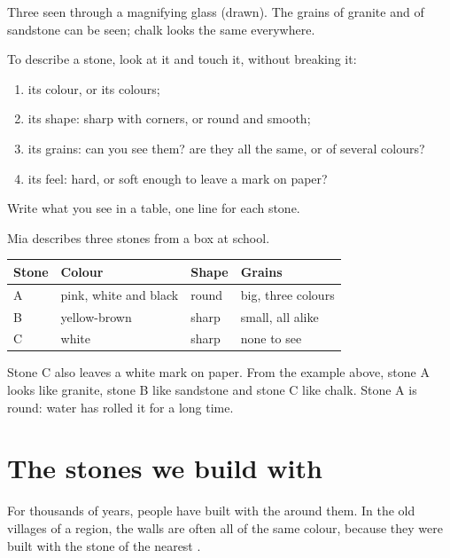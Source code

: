 \begin{omfigure}
{\small Three  seen through a magnifying glass (drawn). The grains of
granite and of sandstone can be seen; chalk looks the same everywhere.}
\label{fig:g3:stones-pebbles-sand:magnified}
\end{omfigure}

\begin{method}\label{met:g3:stones-pebbles-sand:look}
To describe a stone, look at it and touch it, without breaking it:
\begin{enumerate}
  \item its colour, or its colours;
  \item its shape: sharp with corners, or round and smooth;
  \item its grains: can you see them? are they all the same, or of several
        colours?
  \item its feel: hard, or soft enough to leave a mark on paper?
\end{enumerate}
Write what you see in a table, one line for each stone.
\end{method}

\begin{example}\label{ex:g3:stones-pebbles-sand:table}
Mia describes three stones from a box at school.
\begin{center}\small
\begin{tabular}{llll}
\hline
Stone & Colour & Shape & Grains \\
\hline
A & pink, white and black & round & big, three colours \\
B & yellow-brown & sharp & small, all alike \\
C & white & sharp & none to see \\
\hline
\end{tabular}
\end{center}
Stone C also leaves a white mark on paper. From the example above, stone A
looks like granite, stone B like sandstone and stone C like chalk. Stone A
is round: water has rolled it for a long time.
\end{example}

\section{The stones we build with}

For thousands of years, people have built with the  around them. In
the old villages of a region, the walls are often all of the same colour,
because they were built with the stone of the nearest .

